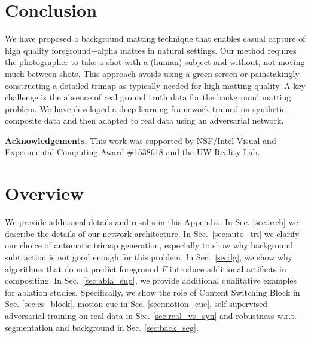 \documentclass[10pt,twocolumn,letterpaper]{article}
\newif\ifarxiv
\begin{document}
 \section{Conclusion}
\vspace{-0.5em}
\label{sec:discussion}
We have proposed a  background matting technique that enables casual capture of high quality foreground+alpha mattes in natural settings.  Our method  requires the photographer to take a shot with a (human) subject and without, not moving much between shots.  This approach avoids using a green screen or painstakingly constructing a detailed trimap as typically needed for high matting quality. A key challenge is the absence of real ground truth data for the background matting problem. We have developed a deep learning framework trained on synthetic-composite data and then adapted to real data using an adversarial network. 

\textbf{Acknowledgements.} This work was supported by NSF/Intel Visual and Experimental Computing Award \#1538618 and the UW Reality Lab.







\clearpage
\newpage








 
\newpage
{\small


}



\ifarxiv
    \newpage
    \clearpage
    \appendix
    \section{Overview}
We provide additional details and results in this Appendix. In Sec. \ref{sec:arch} we describe the details of our network architecture. In Sec.~\ref{sec:auto_tri} we clarify our choice of automatic trimap generation, especially to show why background subtraction is not good enough for this problem.  In Sec.~\ref{sec:fg}, we show why algorithms that do not predict foreground $F$ introduce additional artifacts in compositing. In Sec.~\ref{sec:abla_sup}, we provide additional qualitative examples for ablation studies. Specifically, we show the role of Content Switching Block in Sec. \ref{sec:cs_block}, motion cue in Sec. \ref{sec:motion_cue},  self-supervised adversarial training on real data in Sec. \ref{sec:real_vs_syn} and robustness w.r.t. segmentation and background in Sec. \ref{sec:back_seg}.
\end{document}
